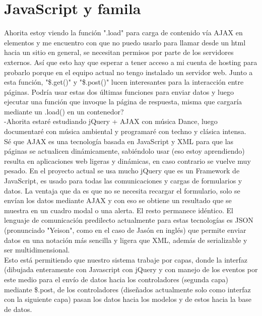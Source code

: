 \documentclass[12pt,spanish,lettersize]{book}
\begin{document}
\section{JavaScript y famila}
Ahorita estoy viendo la funci\'on ".load" para carga de contenido v\'ia AJAX en elementos y me encuentro con que no puedo usarlo para llamar desde un html hacia un sitio en general, se necesitan permisos por parte de los servidores externos. As\'i que esto hay que esperar a tener acceso a mi cuenta de hosting para probarlo porque en el equipo actual no tengo instalado un servidor web. Junto a esta funci\'on, "\$.get()" y "\$.post()" lucen interesantes para la interacci\'on entre p\'aginas. Podr\'ia usar estas dos \'ultimas funciones para enviar datos y luego ejecutar una funci\'on que invoque la p\'agina de respuesta, misma que cargar\'ia mediante un .load() en un contenedor?\\

-Ahorita estar\'e estudiando jQuery + AJAX con m\'usica Dance, luego documentar\'e con m\'usica ambiental y programar\'e con techno y cl\'asica intensa.\\

S\'e que AJAX es una tecnolog\'ia basada en JavaScript y XML para que las p\'aginas se actualicen din\'amicamente, sabi\'endolo usar (eso estoy aprendiendo) resulta en aplicaciones web ligeras y din\'amicas, en caso contrario se vuelve muy pesado. En el proyecto actual se usa mucho jQuery que es un Framework de JavaScript, es usado para todas las comunicaciones y cargas de formularios y datos. La ventaja que da es que no se necesita recargar el formulario, solo se env\'ian los datos mediante AJAX y con eso se obtiene un resultado que se muestra en un cuadro modal o una alerta. El resto permanece id\'entico. El lenguaje de comunicaci\'on predilecto actualmente para estas tecnolog\'ias es JSON (pronunciado "Yeison", como en el caso de Jas\'on en ingl\'es) que permite enviar datos en una notaci\'on m\'as sencilla y ligera que XML, adem\'as de serializable y ser multidimensional. \\

Esto est\'a permitiendo que nuestro sistema trabaje por capas, donde la interfaz (dibujada enteramente con Javascript con jQuery y con manejo de los eventos por este medio para el env\'io de datos hacia los controladores (segunda capa) mediante \$.post, de los controladores (dise\~nados actualmente solo como interfaz con la siguiente capa) pasan los datos hacia los modelos y de estos hacia la base de datos. \\
\end{document}
